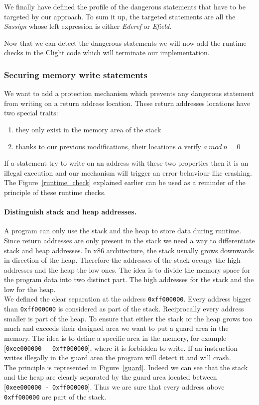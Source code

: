 \documentclass[11pt]{sdm}
\begin{document}
We finally have defined the profile of the dangerous statements that have to be targeted by our approach. To sum it up, the targeted statements are all the \textit{Sassign} whose left expression is either \textit{Ederef} or \textit{Efield}.

Now that we can detect the dangerous statements we will now add the runtime checks in the Clight code which will terminate our implementation.

\subsubsection{Securing memory write statements}
\label{ssub:implem_check_address}
We want to add a protection mechanism which prevents any dangerous statement from writing on a return address location. These return addresses locations have two special traits:
\begin{enumerate}
	\item they only exist in the memory area of the stack
	\item thanks to our previous modifications, their locations $a$ verify $a~mod~n=0$
\end{enumerate}
If a statement try to write on an address with these two properties then it is an illegal execution and our mechanism will trigger an error behaviour like crashing. The Figure~\ref{runtime_check} explained earlier can be used as a reminder of the principle of these runtime checks.

\paragraph{Distinguish stack and heap addresses.}
\label{par:Distinguish stack or heap}
A program can only use the stack and the heap to store data during runtime. Since return addresses are only present in the stack we need a way to differentiate stack and heap addresses.
In x86 architecture, the stack usually grows downwards in direction of the heap. Therefore the addresses of the stack occupy the high addresses and the heap the low ones. 
The idea is to divide the memory space for the program data into two distinct part. The high addresses for the stack and the low for the heap. \\
We defined the clear separation at the address \texttt{0xff000000}. Every address bigger than \texttt{0xff000000} is considered as part of the stack. Reciprocally every address smaller is part of the heap.
To ensure that either the stack or the heap grows too much and exceeds their designed area we want to put a guard area in the memory. The idea is to define a specific area in the memory, for example [\texttt{0xee000000 - \texttt{0xff000000}}], where it is forbidden to write. If an instruction writes illegally in the guard area the program will detect it and will crash.\\
The principle is represented in Figure~\ref{guard}. Indeed we can see that the stack and the heap are clearly separated by the guard area located between [\texttt{0xee000000 - \texttt{0xff000000}}]. Thus we are sure that every address above \texttt{0xff000000} are part of the stack.
\end{document}
